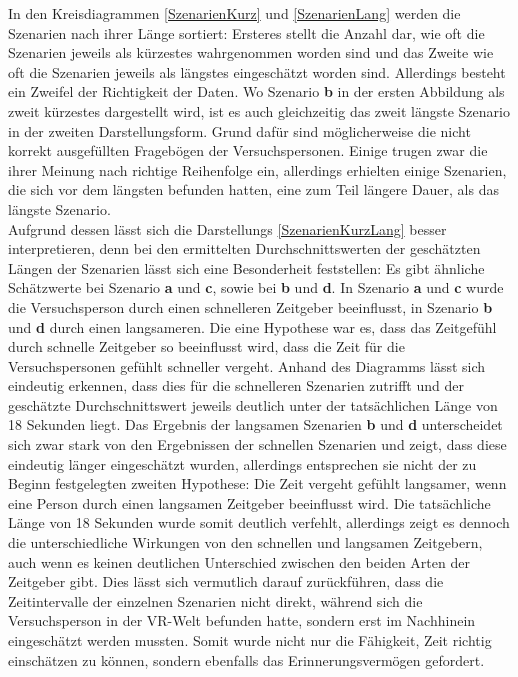 \documentclass{Paper}
\begin{document}
In den Kreisdiagrammen \ref{SzenarienKurz} und \ref{SzenarienLang} werden die Szenarien nach ihrer Länge sortiert: Ersteres stellt die Anzahl dar, wie oft die Szenarien jeweils als kürzestes wahrgenommen worden sind und das Zweite wie oft die Szenarien jeweils als längstes eingeschätzt worden sind. Allerdings besteht ein Zweifel der Richtigkeit der Daten. Wo Szenario \textbf{b} in der ersten Abbildung als zweit kürzestes dargestellt wird, ist es auch gleichzeitig das zweit längste Szenario in der zweiten Darstellungsform. Grund dafür sind möglicherweise die nicht korrekt ausgefüllten Fragebögen der Versuchspersonen. Einige trugen zwar die ihrer Meinung nach richtige Reihenfolge ein, allerdings erhielten einige Szenarien, die sich vor dem längsten befunden hatten, eine zum Teil längere Dauer, als das längste Szenario.\\ Aufgrund dessen lässt sich die Darstellungs \ref{SzenarienKurzLang} besser interpretieren, denn bei den ermittelten Durchschnittswerten der
geschätzten Längen der Szenarien lässt sich eine Besonderheit feststellen:
Es gibt ähnliche Schätzwerte bei Szenario \textbf{a} und \textbf{c}, sowie bei
\textbf{b} und \textbf{d}. In Szenario
\textbf{a} und \textbf{c} wurde die Versuchsperson durch einen schnelleren Zeitgeber
beeinflusst, in Szenario \textbf{b} und \textbf{d} durch einen langsameren.
Die eine Hypothese war es, dass das Zeitgefühl durch schnelle Zeitgeber so beeinflusst
wird, dass die Zeit für die Versuchspersonen gefühlt schneller vergeht. Anhand des
Diagramms lässt sich eindeutig erkennen, dass dies für die schnelleren Szenarien
zutrifft und der geschätzte Durchschnittswert jeweils deutlich unter der
tatsächlichen Länge von 18 Sekunden liegt. Das Ergebnis der langsamen Szenarien \textbf{b} und
\textbf{d} unterscheidet sich zwar stark von den Ergebnissen der schnellen
Szenarien und zeigt, dass diese eindeutig länger eingeschätzt wurden, allerdings
entsprechen sie nicht der zu Beginn festgelegten zweiten Hypothese: Die Zeit vergeht 
gefühlt langsamer, wenn eine Person durch einen langsamen Zeitgeber beeinflusst wird. Die
tatsächliche Länge von 18 Sekunden wurde somit deutlich verfehlt, allerdings zeigt es dennoch
die unterschiedliche Wirkungen von den schnellen und langsamen Zeitgebern, auch wenn es keinen
deutlichen Unterschied zwischen den beiden Arten der Zeitgeber gibt. Dies lässt sich vermutlich
darauf zurückführen, dass die Zeitintervalle der einzelnen Szenarien nicht direkt, während sich
die Versuchsperson in der VR-Welt befunden hatte, sondern erst im Nachhinein eingeschätzt werden mussten.
Somit wurde nicht nur die Fähigkeit, Zeit richtig einschätzen zu können, sondern
ebenfalls das Erinnerungsvermögen gefordert.
\end{document}
